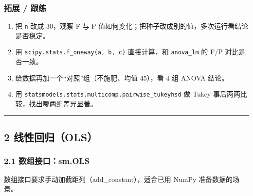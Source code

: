 \subsubsection{拓展 / 跟练}\label{ux62d3ux5c55-ux8ddfux7ec3-16}

\begin{enumerate}
\def\labelenumi{\arabic{enumi}.}
\tightlist
\item
  把 \texttt{n} 改成 30，观察 F 与 P
  值如何变化；把种子改成别的值，多次运行看结论是否稳定。
\item
  用 \texttt{scipy.stats.f\_oneway(a,\ b,\ c)} 直接计算，和
  \texttt{anova\_lm} 的 F/P 对比是否一致。
\item
  给数据再加一个``对照''组（不施肥、均值 45），看 4 组 ANOVA 结论。
\item
  用 \texttt{statsmodels.stats.multicomp.pairwise\_tukeyhsd} 做 Tukey
  事后两两比较，找出哪两组差异显著。
\end{enumerate}

\begin{center}\rule{0.5\linewidth}{0.5pt}\end{center}

\subsection{2 线性回归（OLS）}\label{ux7ebfux6027ux56deux5f52ols}

\subsubsection{2.1
数组接口：sm.OLS}\label{ux6570ux7ec4ux63a5ux53e3sm.ols}

数组接口要求手动加截距列（add\_constant），适合已用 NumPy
准备数据的场景。

\begin{Shaded}
\begin{Highlighting}[]

\OperatorTok{=}\NormalTok{)}
\OperatorTok{=}\NormalTok{, }\NormalTok{, }\NormalTok{)}
\OperatorTok{=} \OperatorTok{*}\OperatorTok{+}  \OperatorTok{+}\NormalTok{, }\OperatorTok{=}

\OperatorTok{=}\OperatorTok{{-}}\NormalTok{, }\NormalTok{))}
\OperatorTok{=}
\NormalTok{(}
\NormalTok{(}
\end{Highlighting}
\end{Shaded}

